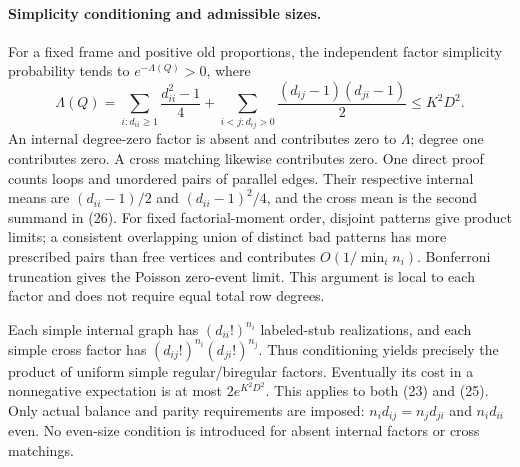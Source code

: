 \documentclass[11pt]{article}
\begin{document}
\paragraph{Simplicity conditioning and admissible sizes.}
For a fixed frame and positive old proportions, the independent
factor simplicity probability tends to $e^{-\Lambda(Q)}>0$, where
\[
 \Lambda(Q)=\sum_{i:d_{ii}\geq1}\frac{d_{ii}^2-1}{4}
       +\sum_{i<j:d_{ij}>0}\frac{(d_{ij}-1)(d_{ji}-1)}2
       \leq K^2D^2.                              \tag{26}
\]
An internal degree-zero factor is absent and contributes zero to
$\Lambda$; degree one contributes zero. A cross matching likewise
contributes zero. One direct proof counts loops and unordered pairs
of parallel edges. Their respective internal means are
$(d_{ii}-1)/2$ and $(d_{ii}-1)^2/4$, and the cross mean is the second
summand in (26). For fixed factorial-moment order, disjoint patterns
give product limits; a consistent overlapping union of distinct bad
patterns has more prescribed pairs than free vertices and contributes
$O(1/\min_i n_i)$. Bonferroni truncation gives the Poisson zero-event
limit. This argument is local to each factor and does not require
equal total row degrees.

Each simple internal graph has $(d_{ii}!)^{n_i}$ labeled-stub
realizations, and each simple cross factor has
$(d_{ij}!)^{n_i}(d_{ji}!)^{n_j}$. Thus conditioning yields precisely
the product of uniform simple regular/biregular factors.
Eventually its cost in a nonnegative expectation is at most
$2e^{K^2D^2}$. This applies to both (23) and (25).
Only actual balance and parity requirements are imposed:
$n_id_{ij}=n_jd_{ji}$ and $n_id_{ii}$ even. No even-size condition is
introduced for absent internal factors or cross matchings.
\end{document}
